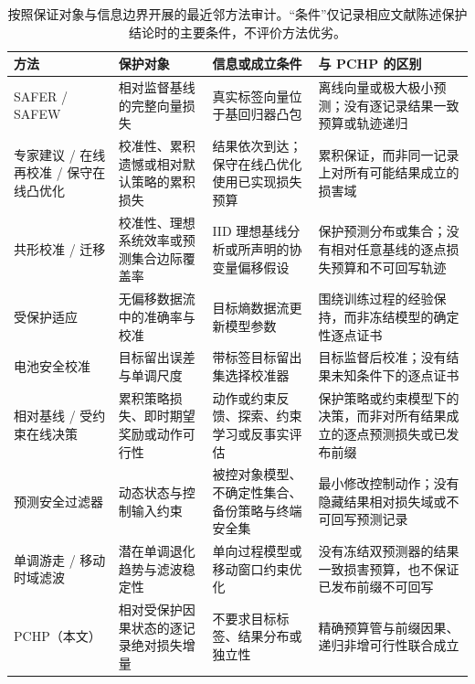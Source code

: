 \documentclass[UTF8,11pt]{ctexart}
\begin{document}
\begin{table}[p]
  \centering
  \caption{按照保证对象与信息边界开展的最近邻方法审计。“条件”仅记录相应文献陈述保护结论时的主要条件，不评价方法优劣。}
  \label{tab:novelty_audit_zh}
  \footnotesize
  \renewcommand{\arraystretch}{0.96}
  \begin{tabularx}{\textwidth}{@{}>{\raggedright\arraybackslash}p{}>{\raggedright\arraybackslash}p{}>{\raggedright\arraybackslash}p{}>{\raggedright\arraybackslash}X@{}}
    \toprule
    方法 & 保护对象 & 信息或成立条件 & 与 PCHP 的区别 \\
    \midrule
    SAFER / SAFEW \citep{li2017safer,li2021safeweak} & 相对监督基线的完整向量损失 & 真实标签向量位于基回归器凸包 & 离线向量或极大极小预测；没有逐记录结果一致预算或轨迹递归 \\
    专家建议 / 在线再校准 / 保守在线凸优化 \citep{chernov2009evaluators,marx2025calibrated,deshpande2025calibrated,bernasconi2021conservative} & 校准性、累积遗憾或相对默认策略的累积损失 & 结果依次到达；保守在线凸优化使用已实现损失预算 & 累积保证，而非同一记录上对所有可能结果成立的损害域 \\
    共形校准 / 迁移 \citep{vovk2020conformal,tuwani2023transport,filgueira2026conformalized} & 校准性、理想系统效率或预测集合边际覆盖率 & IID 理想基线分析或所声明的协变量偏移假设 & 保护预测分布或集合；没有相对任意基线的逐点损失预算和不可回写轨迹 \\
    受保护适应 \citep{bar2024protected} & 无偏移数据流中的准确率与校准 & 目标熵数据流更新模型参数 & 围绕训练过程的经验保持，而非冻结模型的确定性逐点证书 \\
    电池安全校准 \citep{nyachionjeka2026safecalibrated} & 目标留出误差与单调尺度 & 带标签目标留出集选择校准器 & 目标监督后校准；没有结果未知条件下的逐点证书 \\
    相对基线 / 受约束在线决策 \citep{moradipari2020stagewise,deb2025conservative,sridharan2025unknown,vaskov2024donoharm} & 累积策略损失、即时期望奖励或动作可行性 & 动作或约束反馈、探索、约束学习或反事实评估 & 保护策略或约束模型下的决策，而非对所有结果成立的逐点预测损失或已发布前缀 \\
    预测安全过滤器 \citep{wabersich2021predictive} & 动态状态与控制输入约束 & 被控对象模型、不确定性集合、备份策略与终端安全集 & 最小修改控制动作；没有隐藏结果相对损失域或不可回写预测记录 \\
    单调游走 / 移动时域滤波 \citep{samar2004moving,gorinevsky2008efficient} & 潜在单调退化趋势与滤波稳定性 & 单向过程模型或移动窗口约束优化 & 没有冻结双预测器的结果一致损害预算，也不保证已发布前缀不可回写 \\
    PCHP（本文） & 相对受保护因果状态的逐记录绝对损失增量 & 不要求目标标签、结果分布或独立性 & 精确预算管与前缀因果、递归非增可行性联合成立 \\
    \bottomrule
  \end{tabularx}
\end{table}
\end{document}
